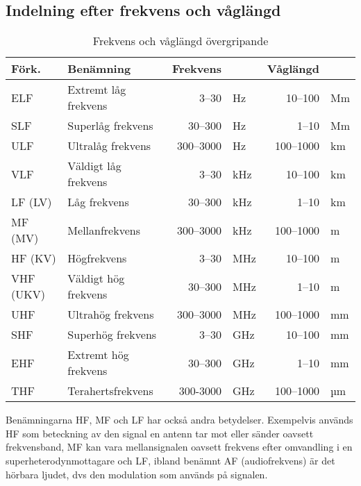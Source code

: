 \subsection{Indelning efter frekvens och våglängd}
\label{frekvens-vaglangd}
\begin{table}[H]
\centering
\begin{tabular}{llrlrl}
	\textbf{Förk.} & \textbf{Benämning}   & \textbf{Frekvens} &     & \textbf{Våglängd} &  \\ \hline
	ELF            & Extremt låg frekvens &             3--30 & Hz  &           10--100 & Mm \\
	SLF            & Superlåg frekvens    &           30--300 & Hz  &             1--10 & Mm \\
	ULF            & Ultralåg frekvens    &         300--3000 & Hz  &         100--1000 & km \\
	VLF            & Väldigt låg frekvens &             3--30 & kHz &           10--100 & km \\
	LF (LV)        & Låg frekvens         &           30--300 & kHz &             1--10 & km \\
	MF (MV)        & Mellanfrekvens       &         300--3000 & kHz &         100--1000 & m  \\
	HF (KV)        & Högfrekvens          &             3--30 & MHz &             10--100 & m  \\
	VHF (UKV)      & Väldigt hög frekvens &           30--300 & MHz &             1--10 & m  \\
	UHF            & Ultrahög frekvens    &         300--3000 & MHz &         100--1000 & mm \\
	SHF            & Superhög frekvens    &             3--30 & GHz &           10--100 & mm \\
	EHF            & Extremt hög frekvens &           30--300 & GHz &             1--10 & mm \\
	THF            & Terahertsfrekvens    &          300-3000 & GHz &         100--1000 & µm
\end{tabular}
\caption{Frekvens och våglängd övergripande}
\end{table}

Benämningarna HF, MF och LF har också andra betydelser. Exempelvis an\-vänd\-s
HF som beteckning av den signal en antenn tar mot eller sänder oavsett
frekvensband, MF kan vara mellansignalen oavsett frekvens efter omvandling i
en superheterodynmottagare och LF, ibland benämnt AF (audiofrekvens) är det
hörbara ljudet, dvs den modulation som används på signalen.

